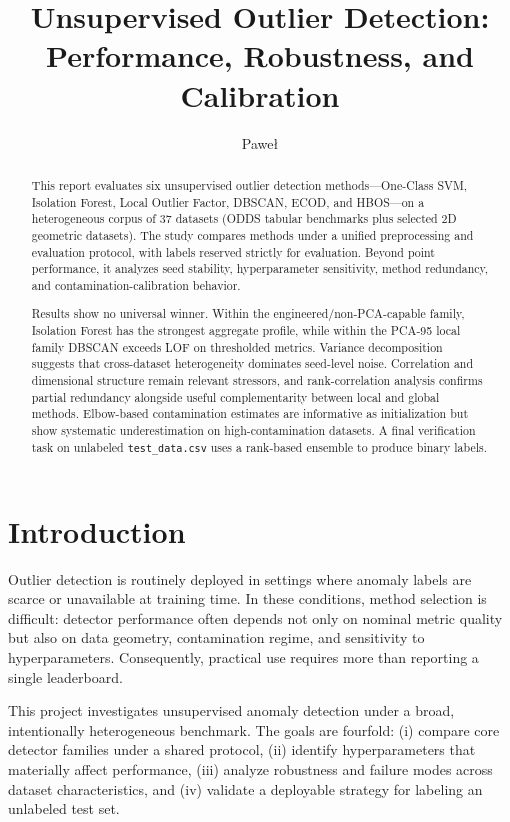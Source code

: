 \documentclass[cameraready]{Interspeech}
\title{Unsupervised Outlier Detection: Performance, Robustness, and Calibration}
\author[affiliation={1}]{Paweł}{Pozorski}
\begin{document}
\maketitle

\begin{abstract}
This report evaluates six unsupervised outlier detection methods---One-Class SVM, Isolation Forest, Local Outlier Factor, DBSCAN, ECOD, and HBOS---on a heterogeneous corpus of 37 datasets (ODDS tabular benchmarks plus selected 2D geometric datasets). The study compares methods under a unified preprocessing and evaluation protocol, with labels reserved strictly for evaluation. Beyond point performance, it analyzes seed stability, hyperparameter sensitivity, method redundancy, and contamination-calibration behavior.

Results show no universal winner. Within the engineered/non-PCA-capable family, Isolation Forest has the strongest aggregate profile, while within the PCA-95 local family DBSCAN exceeds LOF on thresholded metrics. Variance decomposition suggests that cross-dataset heterogeneity dominates seed-level noise. Correlation and dimensional structure remain relevant stressors, and rank-correlation analysis confirms partial redundancy alongside useful complementarity between local and global methods. Elbow-based contamination estimates are informative as initialization but show systematic underestimation on high-contamination datasets. A final verification task on unlabeled \texttt{test\_data.csv} uses a rank-based ensemble to produce binary labels.
\end{abstract}

\section{Introduction}

Outlier detection is routinely deployed in settings where anomaly labels are scarce or unavailable at training time. In these conditions, method selection is difficult: detector performance often depends not only on nominal metric quality but also on data geometry, contamination regime, and sensitivity to hyperparameters. Consequently, practical use requires more than reporting a single leaderboard.

This project investigates unsupervised anomaly detection under a broad, intentionally heterogeneous benchmark. The goals are fourfold: (i) compare core detector families under a shared protocol, (ii) identify hyperparameters that materially affect performance, (iii) analyze robustness and failure modes across dataset characteristics, and (iv) validate a deployable strategy for labeling an unlabeled test set.
\end{document}
